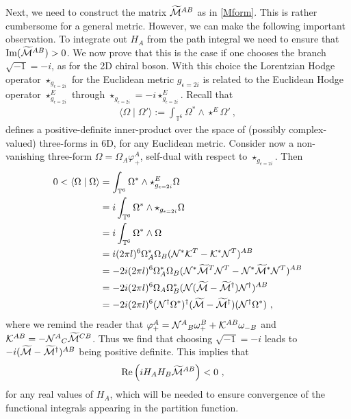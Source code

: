 \documentclass[11pt]{article}
\numberwithin{equation}{section}
\begin{document}
Next, we need to construct the matrix $\widetilde {\cal M}^{AB}$ as in \eqref{Mform}. This is rather cumbersome for a general metric. However, we can make the following important observation. To integrate out $H_A$ from the path integral we need to ensure that $\mathrm{Im}(\widetilde {\cal M}^{AB})>0$. We now prove that this is the case if one chooses the branch $\sqrt{-1}=-i$, as for the 2D chiral boson. With this choice the Lorentzian Hodge operator $\star_{g_{\epsilon= 2i}}$ for the Euclidean metric $g_{\epsilon=2i}$ is related to the Euclidean Hodge operator $\star^E_{g_{\epsilon= 2i}}$ through $\star_{g_{\epsilon= 2i}}=-i\star^E_{g_{\epsilon= 2i}}$. Recall that 
\begin{align}
\langle \Omega \mid \Omega'\rangle := \int_{\mathbb{T}^{6}} \Omega^*\wedge \star
^E\Omega'\ ,
\end{align}
defines a positive-definite inner-product over the space of (possibly complex-valued) three-forms in 6D, for any Euclidean metric. Consider now a non-vanishing three-form $\Omega = \Omega_A\varphi^A_+$, self-dual with respect to $\star_{g_{\epsilon= 2i}}$. Then
\begin{align}
0<\langle \Omega \mid \Omega\rangle 	&=\int_{\mathbb{T}^{6}} \Omega^*\wedge \star^E_{g_{\epsilon=2i}}\Omega\nonumber\\
&=i\int_{\mathbb{T}^{6}} \Omega^*\wedge \star_{g_{\epsilon=2i}}\Omega\nonumber\\
&=i\int_{\mathbb{T}^{6}} \Omega^*\wedge \Omega\nonumber\\
	&=i(2\pi l)^6\Omega^*_A\Omega_B({\cal N}^*{\cal K}^T - {\cal K}^*{\cal N}^T)^{AB}\nonumber\\ &= -2i(2\pi l)^6\Omega^*_A\Omega_B({\cal N}^*\widetilde{\cal M}^T{\cal N}^T-{\cal N}^*\widetilde{\cal M}^*{\cal N}^T )^{AB}\nonumber\\
&=-2i(2\pi l)^6\Omega_A\Omega^*_B({\cal N}(\widetilde{\cal M}-\widetilde{\cal M}^\dag){\cal N}^\dag )^{AB}\nonumber\\
	&= -2i (2\pi l)^6({\cal N}^\dag{\Omega}^*)^\dag(\widetilde{\cal M}-\widetilde{\cal M}^\dag)({\cal N}^\dag\Omega^*)\ ,
\end{align}
where we remind the reader that 
$\varphi^A_+ =     {\cal N}^A{}_B\omega^B_+ + {\cal K}^{AB}\omega_{-B}$ and  ${\cal K}^{AB} = -{\cal N}^{A}{}_C \widetilde{\cal M}^{CB}$.
Thus we find that choosing $\sqrt{-1}=-i$ leads to $-i(\widetilde{\cal M}-\widetilde{\cal M}^\dag)^{AB}$ being positive definite. This implies that
\begin{align}
{\rm Re}\left( i H_AH_B\widetilde{\cal M}^{AB}\right)  &< 0\ ,
\end{align}
for any real values of $H_A$, which will be needed to ensure convergence of the functional integrals appearing in the partition function.
\end{document}
